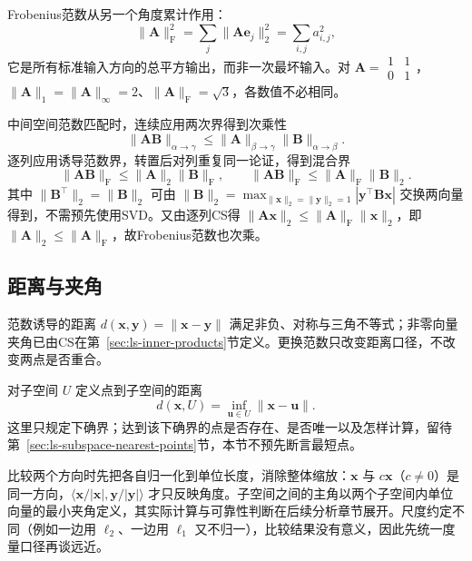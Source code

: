 Frobenius范数从另一个角度累计作用：
\[
 \lVert\bm A\rVert_{\mathrm F}^2
 =\sum_j\lVert\bm A\bm e_j\rVert_2^2
 =\sum_{i,j}a_{i,j}^2,
\]
它是所有标准输入方向的总平方输出，而非一次最坏输入。对 $\bm A=\begin{smallmatrix}1&1\\0&1\end{smallmatrix}$，$\lVert\bm A\rVert_1=\lVert\bm A\rVert_\infty=2$、$\lVert\bm A\rVert_{\mathrm F}=\sqrt3$，各数值不必相同。

中间空间范数匹配时，连续应用两次界得到次乘性
\[
 \lVert\bm A\bm B\rVert_{\alpha\to\gamma}
 \leq\lVert\bm A\rVert_{\beta\to\gamma}
 \lVert\bm B\rVert_{\alpha\to\beta}.
\]
逐列应用诱导范数界，转置后对列重复同一论证，得到混合界
\begin{equation}
 \lVert\bm A\bm B\rVert_{\mathrm F}
 \leq\lVert\bm A\rVert_2\lVert\bm B\rVert_{\mathrm F},
 \qquad
 \lVert\bm A\bm B\rVert_{\mathrm F}
 \leq\lVert\bm A\rVert_{\mathrm F}\lVert\bm B\rVert_2.
 \label{eq:matrix-analysis-mixed-submultiplicativity}
\end{equation}
其中 $\lVert\bm B^\top\rVert_2=\lVert\bm B\rVert_2$ 可由
$\lVert\bm B\rVert_2=\max_{\lVert\bm x\rVert_2=\lVert\bm y\rVert_2=1}|\bm y^\top\bm B\bm x|$ 交换两向量得到，不需预先使用SVD。又由逐列CS得 $\lVert\bm A\bm x\rVert_2\leq\lVert\bm A\rVert_{\mathrm F}\lVert\bm x\rVert_2$，即 $\lVert\bm A\rVert_2\leq\lVert\bm A\rVert_{\mathrm F}$，故Frobenius范数也次乘。

\subsection{距离与夹角}

范数诱导的距离 $d(\bm x,\bm y)=\lVert\bm x-\bm y\rVert$ 满足非负、对称与三角不等式；非零向量夹角已由CS在第~\ref{sec:ls-inner-products}节定义。更换范数只改变距离口径，不改变两点是否重合。

对子空间 $U$ 定义点到子空间的距离
\[
 d(\bm x,U)=\inf_{\bm u\in U}\lVert\bm x-\bm u\rVert.
\]
这里只规定下确界；达到该下确界的点是否存在、是否唯一以及怎样计算，留待第~\ref{sec:ls-subspace-nearest-points}节，本节不预先断言最短点。

比较两个方向时先把各自归一化到单位长度，消除整体缩放：$\bm x$ 与 $c\bm x$（$c\neq0$）是同一方向，$\langle\bm x/|\bm x|,\bm y/|\bm y|\rangle$ 才只反映角度。子空间之间的主角以两个子空间内单位向量的最小夹角定义，其实际计算与可靠性判断在后续分析章节展开。尺度约定不同（例如一边用 $\ell_2$、一边用 $\ell_1$ 又不归一），比较结果没有意义，因此先统一度量口径再谈远近。

